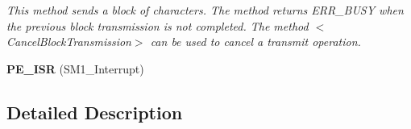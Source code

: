 \begin{DoxyCompactItemize}
\begin{DoxyCompactList}\small\item\em This method sends a block of characters. The method returns E\-R\-R\-\_\-\-B\-U\-S\-Y when the previous block transmission is not completed. The method $<$\-Cancel\-Block\-Transmission$>$ can be used to cancel a transmit operation. \end{DoxyCompactList}\item 
\hypertarget{group___s_m1__module_ga07db021879ada24b9ba2af238b6af653}{{\bfseries P\-E\-\_\-\-I\-S\-R} (S\-M1\-\_\-\-Interrupt)}\label{group___s_m1__module_ga07db021879ada24b9ba2af238b6af653}

\end{DoxyCompactItemize}


\subsection{Detailed Description}


